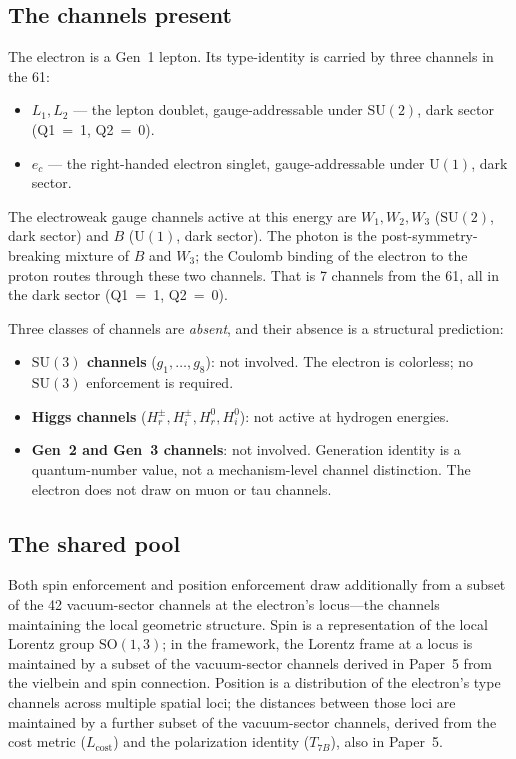 \documentclass[11pt]{article}
\newenvironment{varlist}{\begin{itemize}[nosep,leftmargin=2em]}{\end{itemize}}
\newcommand{\SU}{\mathrm{SU}}
\newcommand{\U}{\mathrm{U}}
\begin{document}
\subsection*{The channels present}

The electron is a Gen~1 lepton.  Its type-identity is carried by three
channels in the 61:

\begin{varlist}
\item $L_1, L_2$ --- the lepton doublet, gauge-addressable under
$\SU(2)$, dark sector (Q1~=~1, Q2~=~0).
\item $e_c$ --- the right-handed electron singlet, gauge-addressable
under $\U(1)$, dark sector.
\end{varlist}

The electroweak gauge channels active at this energy are $W_1, W_2, W_3$
($\SU(2)$, dark sector) and $B$ ($\U(1)$, dark sector).  The photon is
the post-symmetry-breaking mixture of $B$ and $W_3$; the Coulomb binding
of the electron to the proton routes through these two channels.  That is
7 channels from the 61, all in the dark sector (Q1~=~1, Q2~=~0).

Three classes of channels are \emph{absent}, and their absence is a
structural prediction:

\begin{varlist}
\item \textbf{$\SU(3)$ channels} ($g_1,\ldots,g_8$): not involved.  The
electron is colorless; no $\SU(3)$ enforcement is required.
\item \textbf{Higgs channels} ($H^\pm_r, H^\pm_i, H^0_r, H^0_i$): not
active at hydrogen energies.
\item \textbf{Gen~2 and Gen~3 channels}: not involved.  Generation
identity is a quantum-number value, not a mechanism-level channel
distinction.  The electron does not draw on muon or tau channels.
\end{varlist}

\subsection*{The shared pool}

Both spin enforcement and position enforcement draw additionally from a
subset of the 42 vacuum-sector channels at the electron's
locus---the channels maintaining the local geometric structure.  Spin is
a representation of the local Lorentz group $\mathrm{SO}(1,3)$; in the
framework, the Lorentz frame at a locus is maintained by a subset of the
vacuum-sector channels derived in Paper~5 from the vielbein and spin
connection.  Position is a distribution of the electron's type channels
across multiple spatial loci; the distances between those loci are
maintained by a further subset of the vacuum-sector channels, derived
from the cost metric ($L_{\mathrm{cost}}$) and the polarization identity
($T_{7B}$), also in Paper~5.
\end{document}
